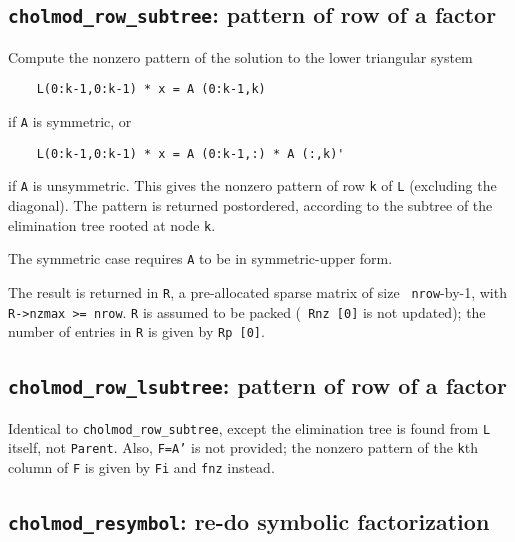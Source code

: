 \documentclass[11pt]{article}
\begin{document}

\subsection{{\tt cholmod\_row\_subtree}: pattern of row of a factor}


Compute the nonzero pattern of the solution to the lower triangular system
\begin{verbatim}
    L(0:k-1,0:k-1) * x = A (0:k-1,k)
\end{verbatim}
if {\tt A} is symmetric, or
\begin{verbatim}
    L(0:k-1,0:k-1) * x = A (0:k-1,:) * A (:,k)'
\end{verbatim}
if {\tt A} is unsymmetric.  This gives the nonzero pattern of row {\tt k} of
{\tt L} (excluding the diagonal).  The pattern is returned postordered,
according to the subtree of the elimination tree rooted at node {\tt k}.

The symmetric case requires {\tt A} to be in symmetric-upper form.

The result is returned in {\tt R}, a pre-allocated sparse matrix of size {\tt
nrow}-by-1, with {\tt R->nzmax >= nrow}.  {\tt R} is assumed to be packed ({\tt
Rnz [0]} is not updated); the number of entries in {\tt R} is given by {\tt Rp
[0]}.

\subsection{{\tt cholmod\_row\_lsubtree}: pattern of row of a factor}


Identical to {\tt cholmod\_row\_subtree}, except the elimination tree is found
from {\tt L} itself, not {\tt Parent}.  Also, {\tt F=A'} is not provided; the
nonzero pattern of the {\tt k}th column of {\tt F} is given by {\tt Fi} and
{\tt fnz} instead.

\subsection{{\tt cholmod\_resymbol}: re-do symbolic factorization}
\end{document}
